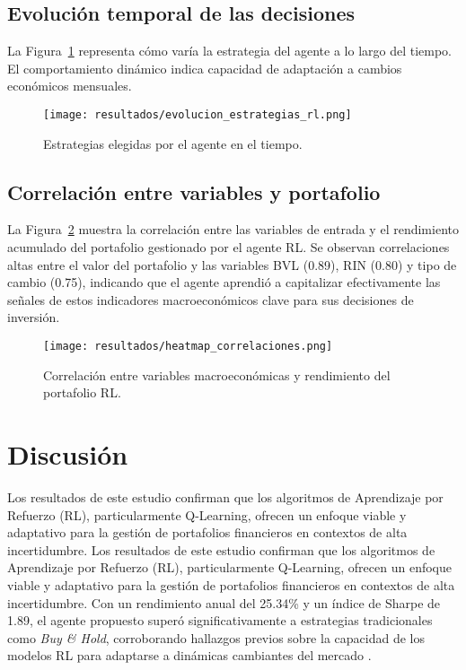 \documentclass[conference]{IEEEtran}
\begin{document}
	\subsection{Evolución temporal de las decisiones}
	
	La Figura~\ref{fig:estrategias} representa cómo varía la estrategia del agente a lo largo del tiempo. El comportamiento dinámico indica capacidad de adaptación a cambios económicos mensuales.
	
	\begin{figure}[ht]
		\centering
		\texttt{[image: resultados/evolucion\_estrategias\_rl.png]}
		\caption{Estrategias elegidas por el agente en el tiempo.}
		\label{fig:estrategias}
	\end{figure}
	
	\subsection{Correlación entre variables y portafolio}
	
	La Figura~\ref{fig:heatmap} muestra la correlación entre las variables de entrada y el rendimiento acumulado del portafolio gestionado por el agente RL. Se observan correlaciones altas entre el valor del portafolio y las variables BVL (0.89), RIN (0.80) y tipo de cambio (0.75), indicando que el agente aprendió a capitalizar efectivamente las señales de estos indicadores macroeconómicos clave para sus decisiones de inversión.
	
	\begin{figure}[ht]
		\centering
		\texttt{[image: resultados/heatmap\_correlaciones.png]}
		\caption{Correlación entre variables macroeconómicas y rendimiento del portafolio RL.}
		\label{fig:heatmap}
	\end{figure}
	
	\section{Discusión}
	
	Los resultados de este estudio confirman que los algoritmos de Aprendizaje por Refuerzo (RL), particularmente Q-Learning, ofrecen un enfoque viable y adaptativo para la gestión de portafolios financieros en contextos de alta incertidumbre. Los resultados de este estudio confirman que los algoritmos de Aprendizaje por Refuerzo (RL), particularmente Q-Learning, ofrecen un enfoque viable y adaptativo para la gestión de portafolios financieros en contextos de alta incertidumbre. Con un rendimiento anual del 25.34\% y un índice de Sharpe de 1.89, el agente propuesto superó significativamente a estrategias tradicionales como \textit{Buy \& Hold}, corroborando hallazgos previos sobre la capacidad de los modelos RL para adaptarse a dinámicas cambiantes del mercado \cite{moody2001learning, almahdi2017adaptive, deng2017deep}.
	
\end{document}
